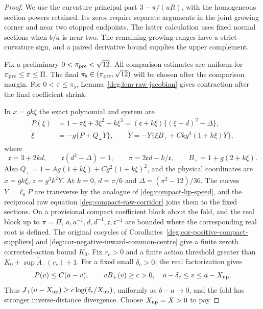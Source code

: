 \begin{proof}
We use the curvature principal part \(3-\pi/(uR)\), with the
homogeneous section powers retained. Its zeros require separate
arguments in the joint growing corner and near two stopped endpoints.
The latter calculation uses fixed normal sections when \(b/a\) is
near two. The remaining growing ranges have a strict curvature sign,
and a paired derivative bound supplies the upper complement.

Fix a preliminary \(0<\pi_{\rm pre}<\sqrt{12}\).
All comparison estimates are uniform for
\(\pi_{\rm pre}\le\pi\le\Pi\). The final
\(\pi_\flat\in(\pi_{\rm pre},\sqrt{12})\) will be chosen after
the comparison margin. For \(0<\pi\le\pi_\flat\),
Lemma~\ref{deg:lem-raw-jacobian} gives contraction after the final
coefficient shrink.

In \(x=gk\xi\) the exact polynomial and system are
\begin{equation}
 \begin{split}
 P(\xi)&=1-\pi\xi+3\xi^2+k\xi^3
       =(\mathfrak c+k\xi)\{(\xi-d)^2-\Delta\},\\
 \dot\xi&=-g\{P+Q_+Y\},\qquad
 \dot Y=-Y\{\xi B_++Ckg^3(1+k\xi)Y\},
 \end{split}
 \label{deg:quadratic-field}
\end{equation}
where
\[
 \mathfrak c=3+2kd,\qquad
 \mathfrak c(d^2-\Delta)=1,\qquad
 \pi=2\mathfrak cd-k/\mathfrak c,\qquad
 B_+=1+g(2+k\xi).
\]
Also \(Q_+=1-Ag(1+k\xi)+Cg^2(1+k\xi)^2\), and
the physical coordinates are \(x=gk\xi\), \(z=g^3k^2Y\).
At \(k=0\), \(d=\pi/6\) and
\(\Delta=(\pi^2-12)/36\). The curves \(Y=\ell_0P\) are transverse
by the analogue of \eqref{deg:compact-lip-speed}, and the reciprocal
raw equation \eqref{deg:compact-raw-corridor} joins them to the fixed
sections. On a provisional compact coefficient block about the fold,
and the real block up to \(\pi=\Pi\),
\(a,a^{-1},d,d^{-1},\mathfrak c,\mathfrak c^{-1}\) are bounded
where the corresponding real root is defined.
The original cocycles of Corollaries~\ref{deg:cor-positive-compact-suppliers}
and \ref{deg:cor-negative-inward-common-centre} give a finite
zeroth corrected-action bound \(K_0\). Fix \(r_c>0\) and a finite
action threshold greater than
\(K_0+\sup\widetilde A_-(r_c)+1\).
For a fixed small \(\delta_c>0\), the real factorization gives
\[
 P(v)\le C(a-v),\qquad vB_+(v)\ge c>0,
 \quad a-\delta_c\le v\le a-X_{\rm up}.
\]
Thus \(J_+(a-X_{\rm up})\ge c\log(\delta_c/X_{\rm up})\),
uniformly as \(b-a\to0\), and the fold has stronger
inverse-distance divergence. Choose \(X_{\rm up}=X>0\) to pay

\end{proof}
